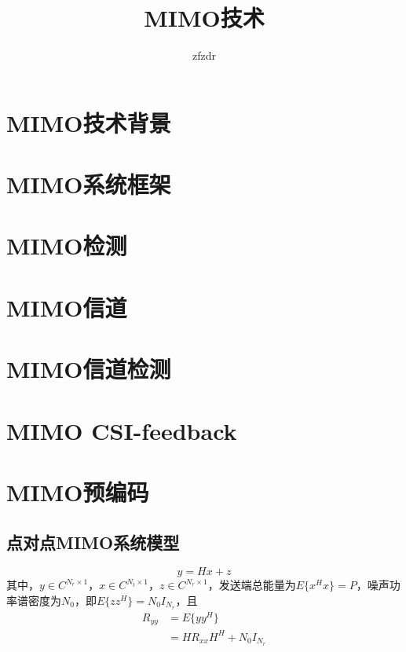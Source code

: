 \documentclass[12pt,a4paper]{ctexart}  %
\author{zfzdr}      %
\title{MIMO技术}    %
\begin{document}
\pagestyle{plain}    %
\maketitle           %
\tableofcontents     %
\section{MIMO技术背景}
\section{MIMO系统框架}
\section{MIMO检测}
\section{MIMO信道}
\section{MIMO信道检测}
\section{MIMO CSI-feedback}
\section{MIMO预编码}
\subsection{点对点MIMO系统模型}
\begin{equation}
    y=Hx+z
\end{equation}
其中，$y\in C^{N_r\times1}$，$x\in C^{N_t\times 1}$，$z\in C^{N_r\times1}$，发送端总能量为$E\{x^Hx\}=P$，噪声功率谱密度为$N_0$，即$E\{zz^H\}=N_0I_{N_r}$，且
\begin{equation}
    \begin{aligned}
        R_{yy}&=E\{yy^H\} \\
        &=HR_{xx}H^H+N_0I_{N_r}
    \end{aligned}
\end{equation}
\end{document}
